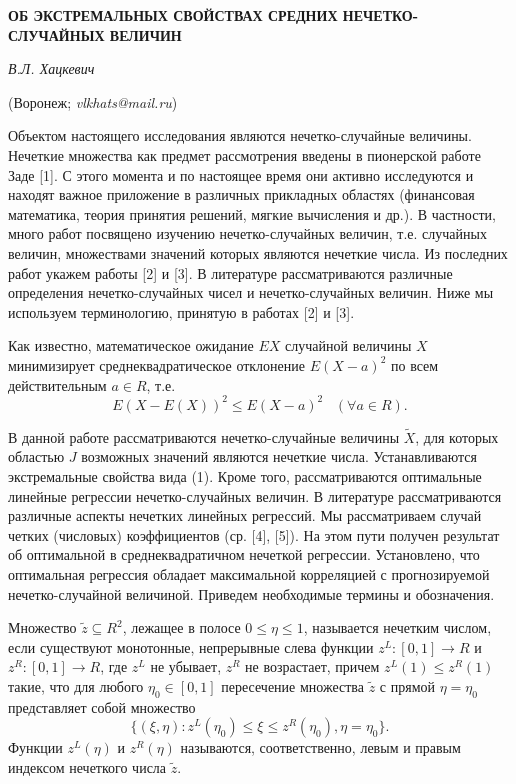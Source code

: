 \begin{center}
    {\bf ОБ ЭКСТРЕМАЛЬНЫХ СВОЙСТВАХ СРЕДНИХ НЕЧЕТКО-СЛУЧАЙНЫХ ВЕЛИЧИН}

    {\it В.Л. Хацкевич}

    (Воронеж; {\it vlkhats@mail.ru})
\end{center}


Объектом настоящего исследования являются нечетко-случайные величины. Нечеткие множества как предмет рассмотрения введены в пионерской работе Заде [1]. С этого момента и по настоящее время они активно исследуются и находят важное приложение в различных прикладных областях (финансовая математика, теория принятия решений, мягкие вычисления и др.). В частности, много работ посвящено изучению нечетко-случайных величин, т.е. случайных величин, множествами значений которых являются нечеткие числа. Из последних работ укажем работы [2]  и [3]. В литературе рассматриваются различные определения нечетко-случайных чисел и нечетко-случайных величин. Ниже мы используем терминологию, принятую в работах [2]  и [3].



Как известно, математическое ожидание $EX$ случайной величины $X$ минимизирует среднеквадратическое отклонение $E(X-a)^2$ по всем действительным $a\in R$, т.е.
\begin{equation}
E(X-E(X))^2\leq E(X-a)^2\,\,\,\,\,(\forall a\in R).
\end{equation}

В данной работе рассматриваются нечетко-случайные величины $\tilde{X}$, для которых областью $J$ возможных значений являются нечеткие числа. Устанавливаются экстремальные свойства вида (1).  Кроме того, рассматриваются оптимальные линейные регрессии нечетко-случайных величин. В литературе рассматриваются различные аспекты нечетких линейных регрессий. Мы рассматриваем случай четких (числовых) коэффициентов (ср. [4], [5]).  На этом пути получен  результат об оптимальной в среднеквадратичном нечеткой регрессии. Установлено, что оптимальная регрессия обладает максимальной корреляцией с прогнозируемой нечетко-случайной величиной. Приведем необходимые термины и обозначения.

Множество $\tilde{z}\subseteq R^2$, лежащее в полосе $0\leq \eta\leq 1$, называется нечетким числом, если существуют монотонные, непрерывные слева функции $z^L:[0,1]\rightarrow R$ и $z^R:[0,1]\rightarrow R$, где $z^L$ не убывает,  $z^R$ не возрастает, причем $z^L(1)\leq z^R(1)$ такие, что для любого $\eta_0\in[0,1]$ пересечение множества $\tilde{z}$ с прямой $\eta=\eta_0$ представляет собой множество
$$
\{(\xi, \eta): z^L(\eta_0)\leq\xi\leq z^R(\eta_0), \eta=\eta_0\}.
$$
Функции $z^L(\eta)$ и $z^R(\eta)$ называются, соответственно, левым и правым индексом нечеткого числа $\tilde{z}$.

